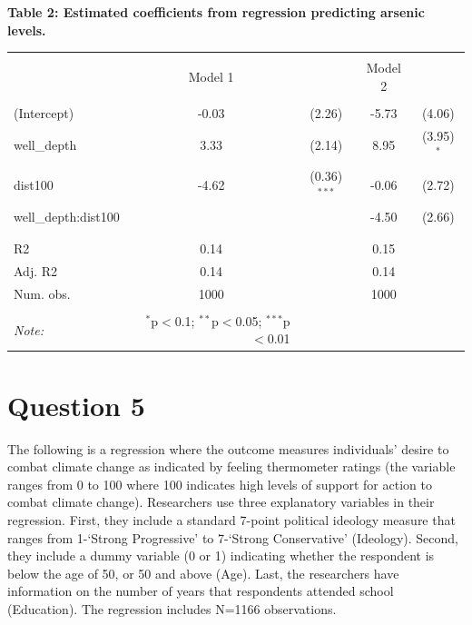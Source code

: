\documentclass[12pt,letterpaper]{article}
\begin{document}

\begin{table}[!htbp]
	\centering 
	\textbf{Table 2: Estimated coefficients from regression predicting arsenic levels.}\\
	\begin{tabular}{@{\extracolsep{5pt}}lcccc} 
		\\
  \hline \\[-1.8ex] 
		& Model 1 & &  Model 2 \\
  \hline \\[-1.8ex] 
   (Intercept) & -0.03  & (2.26) & -5.73  & (4.06)  \\ 
   well\_depth & 3.33  & (2.14) & 8.95  & (3.95) $^{*}$  \\ 
   dist100 & -4.62 & (0.36)$^{***}$ & -0.06  & (2.72) \\ 
   well\_depth:dist100 &  &  & -4.50   & (2.66)  \\ 
   & \\ 
    \hline \\[-1.8ex] 

    R2 & 0.14 & & 0.15 \\ 
    Adj. R2 & 0.14 & &  0.14 \\ 
    Num. obs. &  1000 & & 1000\\ \hline 
    \hline \\[-1.8ex] 
    \textit{Note:}  & \multicolumn{1}{r}{$^{*}$p$<$0.1; $^{**}$p$<$0.05; $^{***}$p$<$0.01} \\ 
  \end{tabular} 
\end{table}  


\newpage
\section*{Question 5}
\noindent The following is a regression where the outcome measures individuals' desire to combat
climate change as indicated by feeling thermometer ratings (the variable ranges from 0 to 100
where 100 indicates high levels of support for action to combat climate change). Researchers
use three explanatory variables in their regression. First, they include a standard 7-point
political ideology measure that ranges from 1-`Strong Progressive' to 7-`Strong Conservative'
(Ideology). Second, they include a dummy variable (0 or 1) indicating whether the respondent
is below the age of 50, or 50 and above (Age). Last, the researchers have information on
the number of years that respondents attended school (Education). The regression includes
N=1166 observations.
\end{document}
